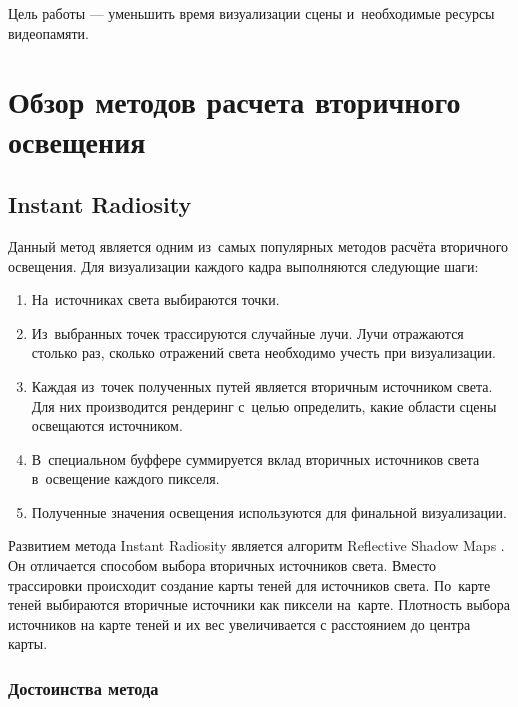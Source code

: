 \documentclass[12pt,fleqn]{article}
\begin{document}
Цель работы --- уменьшить время визуализации сцены и~необходимые ресурсы видеопамяти.

\pagebreak

\section{Обзор методов расчета вторичного освещения}

\subsection{Instant Radiosity}

Данный метод \cite{InstantRadiosity} является одним из~самых популярных методов расчёта вторичного освещения. Для визуализации каждого кадра выполняются следующие шаги:

\begin{enumerate}

\item На~источниках света выбираются точки.

\item Из~выбранных точек трассируются случайные лучи. Лучи отражаются столько раз, сколько отражений света необходимо учесть при визуализации.

\item Каждая из~точек полученных путей является вторичным источником света. Для них производится рендеринг с~целью определить, какие области сцены освещаются источником.

\item В~специальном буффере суммируется вклад вторичных источников света в~освещение каждого пикселя.

\item Полученные значения освещения используются для финальной визуализации.

\end{enumerate}

Развитием метода Instant Radiosity является алгоритм Reflective Shadow Maps \cite{ReflectiveShadowMaps}. Он отличается способом выбора вторичных источников света. Вместо трассировки происходит создание карты теней \cite{ShadowMaps} для источников света. По~карте теней выбираются вторичные источники как пиксели на~карте. Плотность выбора источников на карте теней и их вес увеличивается с расстоянием до центра карты.

\subsubsection{Достоинства метода}
\end{document}
